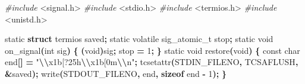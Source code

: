 \documentclass[
  oneside,
  openany]{book}
\newenvironment{Shaded}{\begin{snugshade}}{\end{snugshade}}
\newcommand{\DataTypeTok}[1]{\textcolor[rgb]{0.13,0.29,0.53}{#1}}
\newcommand{\DecValTok}[1]{\textcolor[rgb]{0.00,0.00,0.81}{#1}}
\newcommand{\ImportTok}[1]{#1}
\newcommand{\KeywordTok}[1]{\textcolor[rgb]{0.13,0.29,0.53}{\textbf{#1}}}
\newcommand{\NormalTok}[1]{#1}
\newcommand{\OperatorTok}[1]{\textcolor[rgb]{0.81,0.36,0.00}{\textbf{#1}}}
\newcommand{\PreprocessorTok}[1]{\textcolor[rgb]{0.56,0.35,0.01}{\textit{#1}}}
\newcommand{\SpecialCharTok}[1]{\textcolor[rgb]{0.81,0.36,0.00}{\textbf{#1}}}
\newcommand{\StringTok}[1]{\textcolor[rgb]{0.31,0.60,0.02}{#1}}
\begin{document}
\begin{Shaded}
\begin{Highlighting}[]
\PreprocessorTok{\#include }\ImportTok{\textless{}signal.h\textgreater{}}
\PreprocessorTok{\#include }\ImportTok{\textless{}stdio.h\textgreater{}}
\PreprocessorTok{\#include }\ImportTok{\textless{}termios.h\textgreater{}}
\PreprocessorTok{\#include }\ImportTok{\textless{}unistd.h\textgreater{}}

\DataTypeTok{static} \KeywordTok{struct}\NormalTok{ termios saved}\OperatorTok{;}
\DataTypeTok{static} \DataTypeTok{volatile} \DataTypeTok{sig\_atomic\_t}\NormalTok{ stop}\OperatorTok{;}
\DataTypeTok{static} \DataTypeTok{void}\NormalTok{ on\_signal}\OperatorTok{(}\DataTypeTok{int}\NormalTok{ sig}\OperatorTok{)} \OperatorTok{\{} \OperatorTok{(}\DataTypeTok{void}\OperatorTok{)}\NormalTok{sig}\OperatorTok{;}\NormalTok{ stop }\OperatorTok{=} \DecValTok{1}\OperatorTok{;} \OperatorTok{\}}
\DataTypeTok{static} \DataTypeTok{void}\NormalTok{ restore}\OperatorTok{(}\DataTypeTok{void}\OperatorTok{)} \OperatorTok{\{} \DataTypeTok{const} \DataTypeTok{char}\NormalTok{ end}\OperatorTok{[]} \OperatorTok{=} \StringTok{"}\SpecialCharTok{\textbackslash{}\textbackslash{}}\StringTok{x1b[?25h}\SpecialCharTok{\textbackslash{}\textbackslash{}}\StringTok{x1b[0m}\SpecialCharTok{\textbackslash{}\textbackslash{}}\StringTok{n"}\OperatorTok{;}
\NormalTok{    tcsetattr}\OperatorTok{(}\NormalTok{STDIN\_FILENO}\OperatorTok{,}\NormalTok{ TCSAFLUSH}\OperatorTok{,} \OperatorTok{\&}\NormalTok{saved}\OperatorTok{);}
\NormalTok{    write}\OperatorTok{(}\NormalTok{STDOUT\_FILENO}\OperatorTok{,}\NormalTok{ end}\OperatorTok{,} \KeywordTok{sizeof}\NormalTok{ end }\OperatorTok{{-}} \DecValTok{1}\OperatorTok{);} \OperatorTok{\}}


\end{Highlighting}
\end{Shaded}
\end{document}
